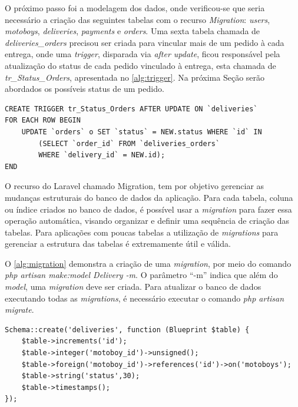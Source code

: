 O próximo passo foi a modelagem dos dados, onde verificou-se que seria necessário a criação das seguintes tabelas com o recurso \textit{Migration}: \textit{users}, \textit{motoboys}, \textit{deliveries}, \textit{payments} e \textit{orders}. Uma sexta tabela chamada de \textit{deliveries\_orders} precisou ser criada para vincular mais de um pedido à cada entrega, onde uma \textit{trigger}, disparada via \textit{after update}, ficou responsável pela atualização do status de cada pedido vinculado à entrega, esta chamada de \textit{tr\_Status\_Orders}, apresentada no \autoref{alg:trigger}. Na próxima Seção serão abordados os possíveis status de um pedido.

\begin{lstlisting}[caption={Delivery Routes - Trigger tr\_Status\_Orders}, label=alg:trigger, style=SQL]
CREATE TRIGGER tr_Status_Orders AFTER UPDATE ON `deliveries`
FOR EACH ROW BEGIN
    UPDATE `orders` o SET `status` = NEW.status WHERE `id` IN
        (SELECT `order_id` FROM `deliveries_orders`
        WHERE `delivery_id` = NEW.id); 
END
\end{lstlisting}

O recurso do Laravel chamado Migration, tem por objetivo gerenciar as mudanças estruturais do banco de dados da aplicação. Para cada tabela, coluna ou índice criados no banco de dados, é possível usar a \textit{migration} para fazer essa operação automática, visando organizar e definir uma sequência de criação das tabelas. Para aplicações com poucas tabelas a utilização de \textit{migrations} para gerenciar a estrutura das tabelas é extremamente útil e válida.

O \autoref{alg:migration} demonstra a criação de uma \textit{migration}, por meio do comando \textit{php artisan make:model Delivery -m}. O parâmetro “-m” indica que além do \textit{model}, uma \textit{migration} deve ser criada.
Para atualizar o banco de dados executando todas as \textit{migrations}, é necessário executar o comando \textit{php artisan migrate}. 

\begin{lstlisting}[caption={Delivery Routes - Exemplo de migration}, style=htmlcssjs, label=alg:migration]
 Schema::create('deliveries', function (Blueprint $table) {
    $table->increments('id');
    $table->integer('motoboy_id')->unsigned();
    $table->foreign('motoboy_id')->references('id')->on('motoboys');
    $table->string('status',30);
    $table->timestamps();
});
\end{lstlisting}

